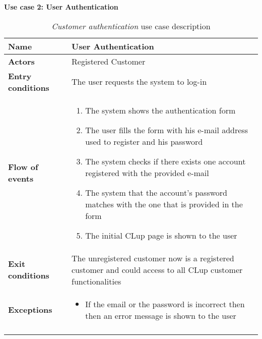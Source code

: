     \clearpage
    \textbf{Use case 2: User Authentication}
    \smallskip
    \begin{longtable}{p{0.25\linewidth}p{0.75\linewidth}}
    \toprule
    \textbf{Name} & \textbf{User Authentication} \\
    \midrule
    \textbf{Actors} & Registered Customer \\
    \midrule
    \textbf{Entry conditions} & The user requests the system to log-in \\
    \midrule
    \textbf{Flow of events} & 
    \begin{enumerate}
        \item The system shows the authentication form
        \item The user fills the form with his e-mail address used to register and his password
        \item The system checks if there exists one account registered with the provided e-mail
        \item The system that the account's password matches with the one that is provided in the form
        \item The initial CLup page is shown to the user
    \end{enumerate}\\
    \midrule
    \textbf{Exit conditions} & The unregistered customer now is a registered customer and could access to all CLup customer functionalities\\
    \midrule
    \textbf{Exceptions} & 
    \begin{itemize}
        \item If the email or the password is incorrect then then an error message is shown to the user 
    \end{itemize} \\
    \bottomrule
    \caption{\emph{Customer authentication} use case description}
    \end{longtable}

